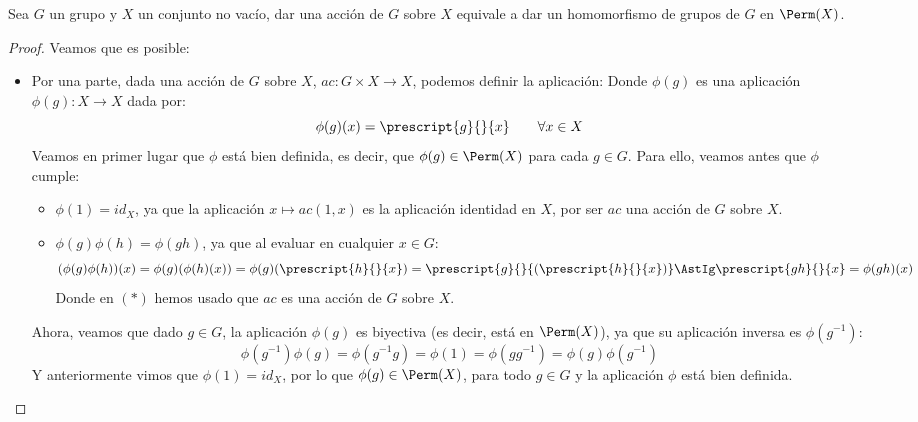 \begin{prop}\label{prop:accion_homomorfismo}
    Sea $G$ un grupo y $X$ un conjunto no vacío, dar una acción de $G$ sobre $X$ equivale a dar un homomorfismo de grupos de $G$ en $\Perm(X)$.
    \begin{proof}
        Veamos que es posible:
        \begin{itemize}
            \item Por una parte, dada una acción de $G$ sobre $X$, $ac:G\times X \to X$, podemos definir la aplicación: 
                Donde $\phi(g)$ es una aplicación $\phi(g):X\longrightarrow X$ dada por:
                \begin{equation*}
                    \phi(g)(x) = \prescript{g}{}{x} \qquad \forall x\in X
                \end{equation*}
                Veamos en primer lugar que $\phi$ está bien definida, es decir, que $\phi(g) \in \Perm(X)$ para cada $g\in G$. Para ello, veamos antes que $\phi$ cumple:
                \begin{itemize}
                    \item $\phi(1) = id_X$, ya que la aplicación $x\mapsto ac(1,x)$ es la aplicación identidad en $X$, por ser $ac$ una acción de $G$ sobre $X$.
                    \item $\phi(g)\phi(h) = \phi(gh)$, ya que al evaluar en cualquier $x\in G$:
                        \begin{equation*}
                            (\phi(g)\phi(h))(x) = \phi(g)(\phi(h)(x)) = \phi(g)(\prescript{h}{}{x}) = \prescript{g}{}{(\prescript{h}{}{x})} \AstIg \prescript{gh}{}{x} = \phi(gh)(x)
                        \end{equation*}
                        Donde en $(\ast)$ hemos usado que $ac$ es una acción de $G$ sobre $X$.
                \end{itemize}
                Ahora, veamos que dado $g\in G$, la aplicación $\phi(g)$ es biyectiva (es decir, está en $\Perm(X)$), ya que su aplicación inversa es $\phi(g^{-1})$:
                \begin{equation*}
                    \phi(g^{-1})\phi(g) = \phi(g^{-1}g) = \phi(1) = \phi(gg^{-1}) = \phi(g) \phi(g^{-1})
                \end{equation*}
                Y anteriormente vimos que $\phi(1) = id_X$, por lo que $\phi(g) \in \Perm(X)$, para todo $g\in G$ y la aplicación $\phi$ está bien definida.\\


\end{itemize}
\end{proof}
\end{prop}
